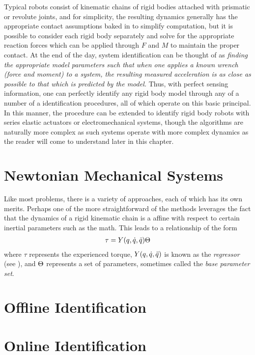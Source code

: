 Typical robots consist of kinematic chains of rigid bodies attached with prismatic or revolute joints, and for
simplicity, the resulting dynamics generally has the appropriate contact assumptions baked in to simplify computation, but it is possible to consider each rigid body separately and solve for the appropriate reaction forces which can be applied through $F$ and $M$ to maintain the proper contact.
%
At the end of the day, system identification can be thought of as {\em finding the appropriate model parameters such that when one applies a known wrench (force and moment) to a system, the resulting measured acceleration is as close as possible to that which is predicted by the model.}
%
Thus, with perfect sensing information, one can perfectly identify any rigid body model through any of a number of a identification procedures, all of which operate on this basic principal.
%
In this manner, the procedure can be extended to identify rigid body robots with series elastic actuators or electromechanical systems, though the algorithms are naturally more complex as such systems operate with more complex dynamics as the reader will come to understand later in this chapter.

\section{Newtonian Mechanical Systems}
Like most problems, there is a variety of approaches, each of which has its own
merits.
%
Perhaps one of the more straightforward of the methods leverages the fact that
the dynamics of a rigid kinematic chain is a affine with respect to certain
inertial parameters such as the math.
%
This leads to a relationship of the form
\begin{align}
  \label{eq:regressor}
  \tau = Y(q, \dot{q}, \ddot{q}) \Theta
\end{align}
where $\tau$ represents the experienced torque, $Y(q, \dot{q}, \ddot{q})$ is known as the
{\em regressor} (see \cite{SV89}), and $\Theta$ represents a set
of parameters, sometimes called the {\em base parameter set}.

\section{Offline Identification}

\section{Online Identification}

